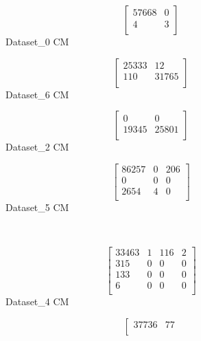 \documentclass[submission,copyright,creativecommons]{eptcs}
\begin{document}
\begin{figure}[h!]
\begin{minipage}{.2\linewidth}
    \centering
    \[\left[\begin{array}{cc}
      57668 & 0\\
      4 & 3\\
    \end{array}\right]\]
    Dataset\_0 CM
  \end{minipage} 
  \begin{minipage}{.2\linewidth}
    \centering
    \[\left[\begin{array}{cc}
      25333 & 12\\
      110 & 31765\\
    \end{array}\right]\]
    Dataset\_6 CM
  \end{minipage} 
  \begin{minipage}{.2\linewidth}
    \centering
    \[\left[\begin{array}{cc}
      0 & 0\\
      19345 & 25801\\
    \end{array}\right]\]
    Dataset\_2 CM
  \end{minipage}
  \begin{minipage}{.2\linewidth}
    \centering
    \[\left[\begin{array}{ccc}
      86257 & 0 & 206\\
      0 & 0 & 0 \\
      2654 & 4 & 0\\
    \end{array}\right]\]
    Dataset\_5 CM
  \end{minipage} 
  \\
  \begin{minipage}{.3\linewidth}
    \centering
    \[\left[\begin{array}{cccc}
      33463 & 1 & 116 & 2\\
      315 & 0 & 0 & 0 \\
      133 & 0 & 0 & 0\\
      6 & 0 & 0 & 0\\
    \end{array}\right]\]
    Dataset\_4 CM
  \end{minipage}
  \begin{minipage}{.2\linewidth}
    \centering
    \[\left[\begin{array}{cc}
      37736 & 77\\

\end{array}\]
\end{minipage}
\end{figure}
\end{document}
